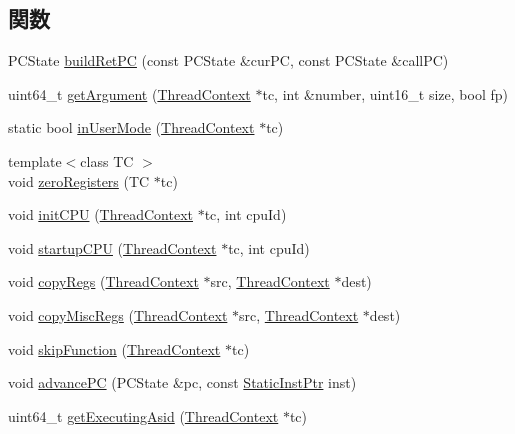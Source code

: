 \subsection*{関数}
\begin{DoxyCompactItemize}
\item 
PCState \hyperlink{namespaceSparcISA_a78daadca16f296fa73d02e493f19ba4a}{buildRetPC} (const PCState \&curPC, const PCState \&callPC)
\item 
uint64\_\-t \hyperlink{namespaceSparcISA_a3f9560369e934be05b1dd8f23fbd6104}{getArgument} (\hyperlink{classThreadContext}{ThreadContext} $\ast$tc, int \&number, uint16\_\-t size, bool fp)
\item 
static bool \hyperlink{namespaceSparcISA_accf04e5f1db51bd27beab2f091d4e999}{inUserMode} (\hyperlink{classThreadContext}{ThreadContext} $\ast$tc)
\item 
{\footnotesize template$<$class TC $>$ }\\void \hyperlink{namespaceSparcISA_a97e4061eeb8177ba68cd308488877c2c}{zeroRegisters} (TC $\ast$tc)
\item 
void \hyperlink{namespaceSparcISA_aded557a1e716c6f849b0e0b05fc77676}{initCPU} (\hyperlink{classThreadContext}{ThreadContext} $\ast$tc, int cpuId)
\item 
void \hyperlink{namespaceSparcISA_a2f2a8ef3b49a1c14f0ee1e3f902528ec}{startupCPU} (\hyperlink{classThreadContext}{ThreadContext} $\ast$tc, int cpuId)
\item 
void \hyperlink{namespaceSparcISA_aaeffcccf262b0dbd3cbcc8b4cef41168}{copyRegs} (\hyperlink{classThreadContext}{ThreadContext} $\ast$src, \hyperlink{classThreadContext}{ThreadContext} $\ast$dest)
\item 
void \hyperlink{namespaceSparcISA_a42833096094e5ff0f2de948bf8e5965c}{copyMiscRegs} (\hyperlink{classThreadContext}{ThreadContext} $\ast$src, \hyperlink{classThreadContext}{ThreadContext} $\ast$dest)
\item 
void \hyperlink{namespaceSparcISA_a2624d7d8bac3eb03de2eb6e83903c208}{skipFunction} (\hyperlink{classThreadContext}{ThreadContext} $\ast$tc)
\item 
void \hyperlink{namespaceSparcISA_acb3999b0d01cc0f4d8bb909b234dfa96}{advancePC} (PCState \&pc, const \hyperlink{classRefCountingPtr}{StaticInstPtr} inst)
\item 
uint64\_\-t \hyperlink{namespaceSparcISA_a01ed5c632599d5d874461f3251873236}{getExecutingAsid} (\hyperlink{classThreadContext}{ThreadContext} $\ast$tc)
\end{DoxyCompactItemize}
